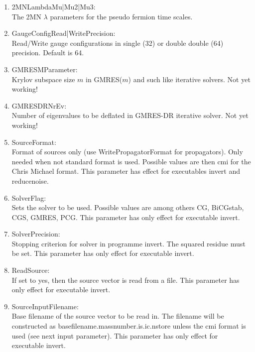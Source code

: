 \begin{enumerate}
\item {\ttfamily 2MNLambdaMu|Mu2|Mu3}:\\
  The 2MN $\lambda$ parameters for the pseudo fermion time scales.

\item {\ttfamily GaugeConfigRead|WritePrecision}:\\
  Read/Write gauge configurations in single (32) or double double (64)
  precision. Default is 64.

\item {\ttfamily GMRESMParameter}:\\
  Krylov subspace size $m$ in GMRES($m$) and such like iterative
  solvers. Not yet working!

\item {\ttfamily GMRESDRNrEv}:\\
  Number of eigenvalues to be deflated in GMRES-DR iterative
  solver. Not yet working!

\item {\ttfamily SourceFormat}:\\
  Format of sources only (use {\ttfamily WritePropagatorFormat} for propagators).
  Only needed when not standard format is used. Possible values are 
  then cmi for the Chris Michael format. This parameter has effect 
  for executables {\ttfamily invert} and {\ttfamily reducenoise}.

\item {\ttfamily SolverFlag}:\\
  Sets the solver to be used. Possible values are among others
  {\ttfamily CG, BiCGstab, CGS, GMRES, PCG}. This parameter has only
  effect for executable {\ttfamily invert}.

\item {\ttfamily SolverPrecision}:\\
  Stopping criterion for solver in programme invert. The squared
  residue must be set. This parameter has only
  effect for executable {\ttfamily invert}.

\item {\ttfamily ReadSource}:\\
  If set to yes, then the source vector is read from a file. This
  parameter has only effect for executable {\ttfamily invert}.

\item {\ttfamily SourceInputFilename}:\\
  Base filename of the source vector to be read in. The filename will
  be constructed as {\ttfamily basefilename.massnumber.is.ic.nstore}
  unless the cmi format is used (see next input parameter). This
  parameter has only effect for executable {\ttfamily invert}.


\end{enumerate}
